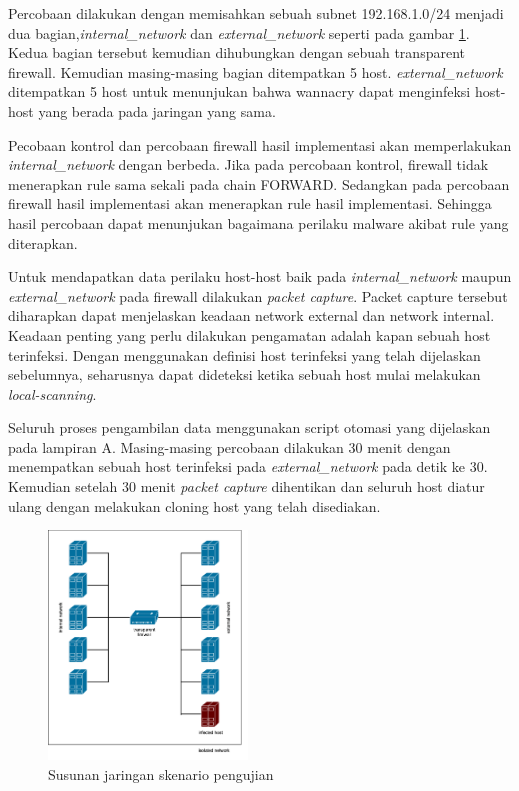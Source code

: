 Percobaan dilakukan dengan memisahkan sebuah subnet 192.168.1.0/24 menjadi dua bagian,\textit{internal\_network} dan \textit{external\_network} seperti pada gambar \ref{fig:validation_scenario}. Kedua bagian tersebut kemudian dihubungkan dengan sebuah transparent firewall. Kemudian masing-masing bagian ditempatkan 5 host. \textit{external\_network} ditempatkan 5 host untuk menunjukan bahwa wannacry dapat menginfeksi host-host yang berada pada jaringan yang sama. 

Pecobaan kontrol dan percobaan firewall hasil implementasi akan memperlakukan \textit{internal\_network} dengan berbeda. Jika pada percobaan kontrol, firewall tidak menerapkan rule sama sekali pada chain FORWARD. Sedangkan pada percobaan firewall hasil implementasi akan menerapkan rule hasil implementasi. Sehingga hasil percobaan dapat menunjukan bagaimana perilaku malware akibat rule yang diterapkan.

Untuk mendapatkan data perilaku host-host baik pada \textit{internal\_network} maupun \textit{external\_network} pada firewall dilakukan \textit{packet capture}. Packet capture tersebut diharapkan dapat menjelaskan keadaan network external dan network internal. Keadaan penting yang perlu dilakukan pengamatan adalah kapan sebuah host terinfeksi. Dengan menggunakan definisi host terinfeksi yang telah dijelaskan sebelumnya, seharusnya dapat dideteksi ketika sebuah host mulai melakukan \textit{local-scanning}.

Seluruh proses pengambilan data menggunakan script otomasi yang dijelaskan pada lampiran A. Masing-masing percobaan dilakukan 30 menit dengan menempatkan sebuah host terinfeksi pada \textit{external\_network} pada detik ke 30. Kemudian setelah 30 menit \textit{packet capture} dihentikan dan seluruh host diatur ulang dengan melakukan cloning host yang telah disediakan.

\begin{figure}[H]
	\centering
	\includegraphics[width=200px]{resources/skenario_pengujian.png}
	\caption{Susunan jaringan skenario pengujian}
	\label{fig:validation_scenario}
\end{figure}

